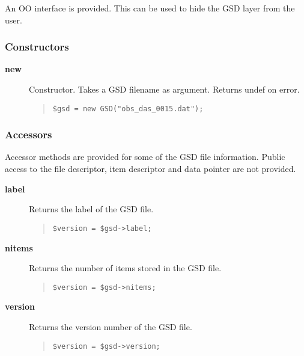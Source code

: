 \documentclass[twoside,11pt]{article}
\newenvironment{myquote}{\begin{quote}\begin{small}}{\end{small}\end{quote}}
\renewcommand{\_}{\texttt{\symbol{95}}}
\begin{document}
An OO interface is provided. This can be used to hide 
the GSD layer from the user.

\subsubsection*{Constructors\label{Constructors}}\begin{description}
\item[\textbf{new}] \mbox{}

Constructor. Takes a GSD filename as argument. Returns undef
on error.

\begin{myquote}
\begin{verbatim}
$gsd = new GSD("obs_das_0015.dat");
\end{verbatim}
\end{myquote} %

\end{description}
\subsubsection*{Accessors\label{Accessors}}

Accessor methods are provided for some of the GSD file
information. Public access to the file descriptor, item descriptor
and data pointer are not provided.

\begin{description}
\item[\textbf{label}] \mbox{}

Returns the label of the GSD file.

\begin{myquote}
\begin{verbatim}
$version = $gsd->label;
\end{verbatim}
\end{myquote}

\item[\textbf{nitems}] \mbox{}

Returns the number of items stored in the GSD file.

\begin{myquote}
\begin{verbatim}
$version = $gsd->nitems;
\end{verbatim}
\end{myquote}

\item[\textbf{version}] \mbox{}

Returns the version number of the GSD file.

\begin{myquote}
\begin{verbatim}
$version = $gsd->version;
\end{verbatim} 
\end{myquote}


\end{description}
\end{document}
